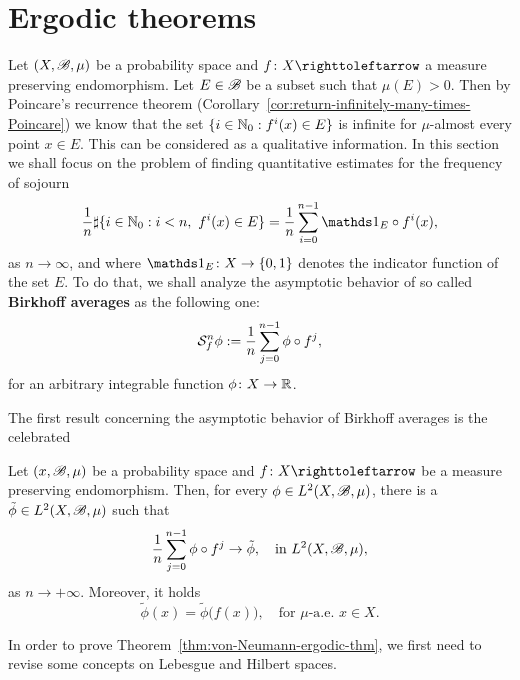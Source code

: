 \section{Ergodic theorems}\label{sec:ergodic-theorems}

Let $(X,\mathscr{B},\mu)$ be a probability space and $f\colon X\carr$ a measure preserving endomorphism. Let $E\in\mathscr{B}$ be a subset such that $\mu(E)>0$. Then by Poincare's recurrence theorem (Corollary~\ref{cor:return-infinitely-many-times-Poincare}) we know that the set $\{i\in\mathbb{N}_{0} : f^{i}(x)\in E\}$ is infinite for $\mu$-almost every point $x\in E$. This can be considered as a qualitative information. In this section we shall focus on the problem of finding quantitative estimates for the frequency of sojourn
\begin{displaymath}
  \frac{1}{n}\sharp\{i\in\N_{0} : i<n,\ f^{i}(x)\in E\} = \frac{1}{n}\sum_{i=0}^{n-1}\ds{1}_{E}\circ f^{i}(x),
\end{displaymath}
as $n\to\infty$, and where $\ds{1}_{E}\colon X\to\{0,1\}$ denotes the indicator function of the set $E$. To do that, we shall analyze the asymptotic behavior of so called \textbf{Birkhoff averages} as the following one:
\begin{displaymath}
  \mathcal{S}_{f}^{n}\phi:=\frac{1}{n}\sum_{j=0}^{n-1}\phi\circ f^{j},
\end{displaymath}
for an arbitrary integrable function $\phi\colon X\to\mathbb{R}$.

The first result concerning the asymptotic behavior of Birkhoff averages is the celebrated

\begin{theorem}\label{thm:von-Neumann-ergodic-thm}
  Let $(x,\mathscr{B},\mu)$ be a probability space and $f\colon X\carr$ be a measure preserving endomorphism. Then, for every $\phi\in L^{2}(X,\mathscr{B},\mu)$, there is a $\tilde\phi\in L^{2}(X,\mathscr{B},\mu)$ such that
  \begin{displaymath}
    \frac{1}{n}\sum_{j=0}^{n-1}\phi\circ f^{j}\to \tilde\phi, \quad\text{in } L^{2}(X,\mathscr{B},\mu),
  \end{displaymath}
  as $n\to +\infty$. Moreover, it holds
  \begin{displaymath}
    \tilde\phi(x)=\tilde \phi\big(f(x)\big), \quad\text{for }\mu\text{-a.e. } x\in X.
  \end{displaymath}
\end{theorem}

In order to prove Theorem~\ref{thm:von-Neumann-ergodic-thm}, we first need to revise some concepts on Lebesgue and Hilbert spaces.

